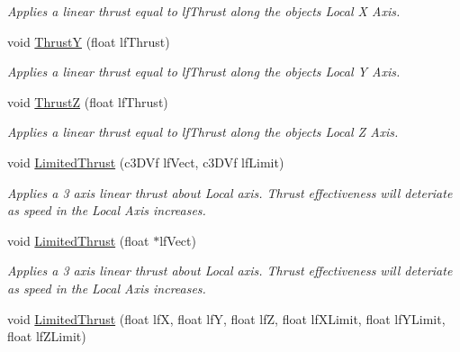 \begin{DoxyCompactItemize}
\begin{DoxyCompactList}\small\item\em Applies a linear thrust equal to lfThrust along the objects Local X Axis. \end{DoxyCompactList}\item 
\hypertarget{classc_momentum_a75f2ef092c9833a7ddef951e0a851519}{
void \hyperlink{classc_momentum_a75f2ef092c9833a7ddef951e0a851519}{ThrustY} (float lfThrust)}
\label{classc_momentum_a75f2ef092c9833a7ddef951e0a851519}

\begin{DoxyCompactList}\small\item\em Applies a linear thrust equal to lfThrust along the objects Local Y Axis. \end{DoxyCompactList}\item 
\hypertarget{classc_momentum_a391c5ecfd1f3bc59b77dc1f3846a3abc}{
void \hyperlink{classc_momentum_a391c5ecfd1f3bc59b77dc1f3846a3abc}{ThrustZ} (float lfThrust)}
\label{classc_momentum_a391c5ecfd1f3bc59b77dc1f3846a3abc}

\begin{DoxyCompactList}\small\item\em Applies a linear thrust equal to lfThrust along the objects Local Z Axis. \end{DoxyCompactList}\item 
\hypertarget{classc_momentum_a3f175575044b2dba890a4c58d6266196}{
void \hyperlink{classc_momentum_a3f175575044b2dba890a4c58d6266196}{LimitedThrust} (c3DVf lfVect, c3DVf lfLimit)}
\label{classc_momentum_a3f175575044b2dba890a4c58d6266196}

\begin{DoxyCompactList}\small\item\em Applies a 3 axis linear thrust about Local axis. Thrust effectiveness will deteriate as speed in the Local Axis increases. \end{DoxyCompactList}\item 
\hypertarget{classc_momentum_a2cf51a54386f252f48ae4f73a21d97f7}{
void \hyperlink{classc_momentum_a2cf51a54386f252f48ae4f73a21d97f7}{LimitedThrust} (float $\ast$lfVect)}
\label{classc_momentum_a2cf51a54386f252f48ae4f73a21d97f7}

\begin{DoxyCompactList}\small\item\em Applies a 3 axis linear thrust about Local axis. Thrust effectiveness will deteriate as speed in the Local Axis increases. \end{DoxyCompactList}\item 
\hypertarget{classc_momentum_aea016c7d28e2d3e2f68fadeefb08d0ea}{
void \hyperlink{classc_momentum_aea016c7d28e2d3e2f68fadeefb08d0ea}{LimitedThrust} (float lfX, float lfY, float lfZ, float lfXLimit, float lfYLimit, float lfZLimit)}
\label{classc_momentum_aea016c7d28e2d3e2f68fadeefb08d0ea}


\end{DoxyCompactItemize}
